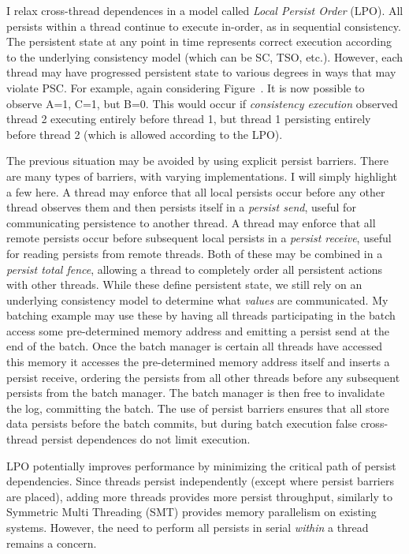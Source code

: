 I relax cross-thread dependences in a model called \emph{Local Persist Order} (LPO).
All persists within a thread continue to execute in-order, as in sequential consistency.
The persistent state at any point in time represents correct execution according to the underlying consistency model (which can be SC, TSO, etc.).
However, each thread may have progressed persistent state to various degrees in ways that may violate PSC.
For example, again considering Figure~.
It is now possible to observe A=1, C=1, but B=0.
This would occur if \emph{consistency execution} observed thread 2 executing entirely before thread 1, but thread 1 persisting entirely before thread 2 (which is allowed according to the LPO).

The previous situation may be avoided by using explicit persist barriers.
There are many types of barriers, with varying implementations.
I will simply highlight a few here.
A thread may enforce that all local persists occur before any other thread observes them and then persists itself in a \emph{persist send}, useful for communicating persistence to another thread.
A thread may enforce that all remote persists occur before subsequent local persists in a \emph{persist receive}, useful for reading persists from remote threads.
Both of these may be combined in a \emph{persist total fence}, allowing a thread to completely order all persistent actions with other threads.
While these define persistent state, we still rely on an underlying consistency model to determine what \emph{values} are communicated.
My batching example may use these by having all threads participating in the batch access some pre-determined memory address and emitting a persist send at the end of the batch.
Once the batch manager is certain all threads have accessed this memory it accesses the pre-determined memory address itself and inserts a persist receive, ordering the persists from all other threads before any subsequent persists from the batch manager.
The batch manager is then free to invalidate the log, committing the batch.
The use of persist barriers ensures that all store data persists before the batch commits, but during batch execution false cross-thread persist dependences do not limit execution.

LPO potentially improves performance by minimizing the critical path of persist dependencies.
Since threads persist independently (except where persist barriers are placed), adding more threads provides more persist throughput, similarly to Symmetric Multi Threading (SMT) provides memory parallelism on existing systems.
However, the need to perform all persists in serial \emph{within} a thread remains a concern.

